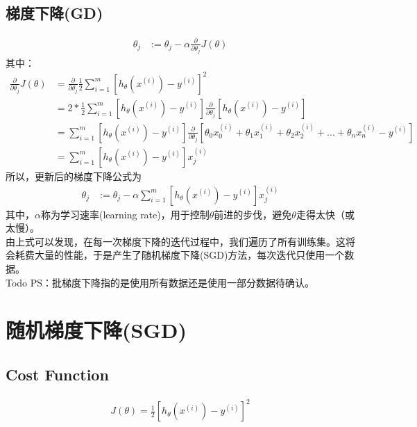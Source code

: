 \subsection{梯度下降(GD)}
\begin{equation}\begin{aligned}
      \theta_j &:= \theta_j - \alpha \frac{\partial} {\partial \theta_j} J(\theta)
\end{aligned}\end{equation}
其中：
\begin{equation}\begin{aligned}
      \frac{\partial} {\partial \theta_j} J(\theta) &= \frac{\partial}{\partial \theta_j} \frac{1}{2} \sum_{i=1}^m\left[ h_\theta(x^{(i)}) - y^{(i)} \right]^2 \\
      &= 2 * \frac{1}{2} \sum_{i=1}^m\left[ h_\theta(x^{(i)}) - y^{(i)} \right] \frac{\partial}{\partial\theta_j}\left[ h_\theta(x^{(i)}) - y^{(i)} \right] \\
      &= \sum_{i=1}^m\left[ h_\theta(x^{(i)}) - y^{(i)} \right]\frac{\partial}{\partial\theta_j}\left[ \theta_0x_0^{(i)} +  \theta_1x_1^{(i)} + \theta_2x_2^{(i)} + ... + \theta_nx_n^{(i)} - y^{(i)} \right] \\
      &= \sum_{i=1}^m\left[ h_\theta(x^{(i)}) - y^{(i)} \right]x_j^{(i)}
\end{aligned}\end{equation}
所以，更新后的梯度下降公式为
\begin{equation}\begin{aligned}
	\theta_j &:= \theta_j - \alpha \sum_{i=1}^m \left[ h_\theta(x^{(i)}) - y^{(i)} \right]x_j^{(i)}
\end{aligned}\end{equation}
其中，$\alpha$称为学习速率(learning rate)，用于控制$\theta$前进的步伐，避免$\theta$走得太快（或太慢）。\\
由上式可以发现，在每一次梯度下降的迭代过程中，我们遍历了所有训练集。这将会耗费大量的性能，于是产生了随机梯度下降(SGD)方法，每次迭代只使用一个数据。
\\ Todo PS：批梯度下降指的是使用所有数据还是使用一部分数据待确认。


\section{随机梯度下降(SGD)}
\subsection{Cost Function}
\begin{equation}\begin{aligned}
	J(\theta) = \frac{1}{2} \left[h_{\theta} {(x^{(i)})} - y^{(i)}\right]^2
\end{aligned}\end{equation}

